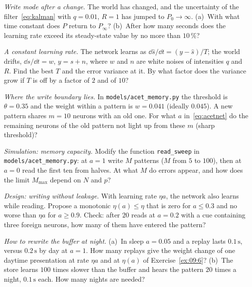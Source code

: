 \begin{exercise}[\lvlB]
\label{ex:09:2}
\emph{Write mode after a change.} The world has changed, and the uncertainty of the filter~\eqref{eq:kalman} with $q=0.01$, $R=1$ has jumped to $P_0\to\infty$. (a)~With what time constant does $P$ return to $P_\infty$? (b)~After how many seconds does the learning rate exceed its steady-state value by no more than $10\,\%$?
\end{exercise}

\begin{exercise}[\lvlB]
\label{ex:09:3}
\emph{A constant learning rate.} The network learns as $\dd\hat s/\dd t=(y-\hat s)/T$; the world drifts, $\dd s/\dd t=w$, $y=s+n$, where $w$ and $n$ are white noises of intensities $q$ and $R$. Find the best $T$ and the error variance at it. By what factor does the variance grow if $T$ is off by a factor of $2$ and of $10$?
\end{exercise}

\begin{exercise}[\lvlB]
\label{ex:09:4}
\emph{Where the write boundary lies.} In \texttt{models/\allowbreak acet\_memory.py} the threshold is $\theta=0.35$ and the weight within a pattern is $w=0.041$ (ideally $0.045$). A new pattern shares $m=10$ neurons with an old one. For what $a$ in~\eqref{eq:acetnet} do the remaining neurons of the old pattern not light up from these $m$ (sharp threshold)?
\end{exercise}

\begin{exercise}[\lvlB]
\label{ex:09:5}
\emph{Simulation: memory capacity.} Modify the function \texttt{read\_sweep} in \texttt{models/\allowbreak acet\_memory.py}: at $a=1$ write $M$ patterns ($M$ from $5$ to $100$), then at $a=0$ read the first ten from halves. At what $M$ do errors appear, and how does the limit $M_{\max}$ depend on $N$ and $p$?
\end{exercise}

\begin{exercise}[\lvlB]
\label{ex:09:6}
\emph{Design: writing without leakage.} With learning rate $\eta a$, the network also learns while reading. Propose a monotonic $\eta(a)\le\eta$ that is zero for $a\le0.3$ and no worse than $\eta a$ for $a\ge0.9$. Check: after $20$ reads at $a=0.2$ with a cue containing three foreign neurons, how many of them have entered the pattern?
\end{exercise}

\begin{exercise}[\lvlC]
\label{ex:09:7}
\emph{How to rewrite the buffer at night.} (a)~In sleep $a=0.05$ and a replay lasts $0.1\,\text{s}$, versus $0.2\,\text{s}$ by day at $a=1$. How many replays give the weight change of one daytime presentation at rate $\eta a$ and at $\eta(a)$ of Exercise~\ref{ex:09:6}? (b)~The store learns $100$ times slower than the buffer and hears the pattern $20$ times a night, $0.1\,\text{s}$ each. How many nights are needed?
\end{exercise}
